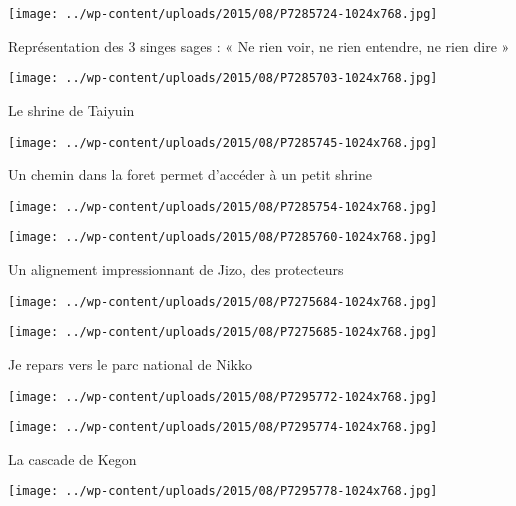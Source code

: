  \newline
 \newline
\centerline{\texttt{[image: ../wp-content/uploads/2015/08/P7285724-1024x768.jpg]} } 
 \newline
 Représentation des 3 singes sages : « Ne rien voir, ne rien entendre, ne rien dire » \newline
 \newline
\centerline{\texttt{[image: ../wp-content/uploads/2015/08/P7285703-1024x768.jpg]} } 
 \newline
 Le shrine de Taiyuin \newline
 \newline
\centerline{\texttt{[image: ../wp-content/uploads/2015/08/P7285745-1024x768.jpg]} } 
 \newline
 Un chemin dans la foret permet d'accéder à un petit shrine \newline
 \newline
\centerline{\texttt{[image: ../wp-content/uploads/2015/08/P7285754-1024x768.jpg]} } 
 \newline
 \newline
\centerline{\texttt{[image: ../wp-content/uploads/2015/08/P7285760-1024x768.jpg]} } 
 \newline
 Un alignement impressionnant de Jizo, des protecteurs \newline
 \newline
\centerline{\texttt{[image: ../wp-content/uploads/2015/08/P7275684-1024x768.jpg]} } 
 \newline
 \newline
\centerline{\texttt{[image: ../wp-content/uploads/2015/08/P7275685-1024x768.jpg]} } 
 \newline
 Je repars vers le parc national de Nikko \newline
 \newline
\centerline{\texttt{[image: ../wp-content/uploads/2015/08/P7295772-1024x768.jpg]} } 
 \newline
 \newline
\centerline{\texttt{[image: ../wp-content/uploads/2015/08/P7295774-1024x768.jpg]} } 
 \newline
 La cascade de Kegon \newline
 \newline
\centerline{\texttt{[image: ../wp-content/uploads/2015/08/P7295778-1024x768.jpg]} } 
 \newline
